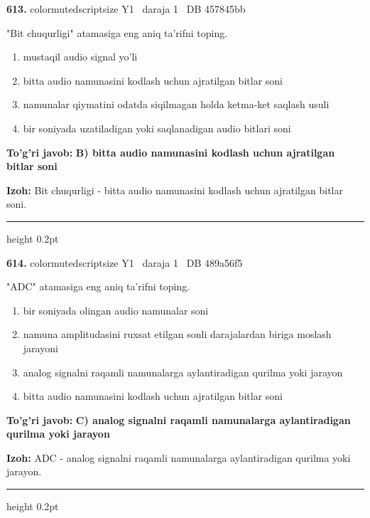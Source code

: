 \documentclass[10pt,a4paper,oneside]{article}
\begin{document}
\noindent\textbf{\color{ink}613.}  {color{muted}scriptsize Y1 \textbullet\ daraja 1 \textbullet\ DB 457845bb}
\par
"Bit chuqurligi" atamasiga eng aniq ta'rifni toping.
\begin{enumerate}[label=\Alph*),leftmargin=9mm]
\item mustaqil audio signal yo'li
\item bitta audio namunasini kodlash uchun ajratilgan bitlar soni
\item namunalar qiymatini odatda siqilmagan holda ketma-ket saqlash usuli
\item bir soniyada uzatiladigan yoki saqlanadigan audio bitlari soni
\end{enumerate}
\begin{tcolorbox}[enhanced,breakable,colback=teal!4,colframe=teal!50!black,boxrule=0.5pt,arc=1.1mm,left=3mm,right=3mm,top=1.7mm,bottom=1.7mm,before skip=2mm,after skip=2mm]
\textbf{\color{teal}To'g'ri javob:} \textbf{B) bitta audio namunasini kodlash uchun ajratilgan bitlar soni}
\par\smallskip
\textbf{Izoh:} Bit chuqurligi - bitta audio namunasini kodlash uchun ajratilgan bitlar soni.
\end{tcolorbox}
\vspace{2mm}\hrule height 0.2pt \vspace{3mm}

\noindent\textbf{\color{ink}614.}  {color{muted}scriptsize Y1 \textbullet\ daraja 1 \textbullet\ DB 489a56f5}
\par
"ADC" atamasiga eng aniq ta'rifni toping.
\begin{enumerate}[label=\Alph*),leftmargin=9mm]
\item bir soniyada olingan audio namunalar soni
\item namuna amplitudasini ruxsat etilgan sonli darajalardan biriga moslash jarayoni
\item analog signalni raqamli namunalarga aylantiradigan qurilma yoki jarayon
\item bitta audio namunasini kodlash uchun ajratilgan bitlar soni
\end{enumerate}
\begin{tcolorbox}[enhanced,breakable,colback=teal!4,colframe=teal!50!black,boxrule=0.5pt,arc=1.1mm,left=3mm,right=3mm,top=1.7mm,bottom=1.7mm,before skip=2mm,after skip=2mm]
\textbf{\color{teal}To'g'ri javob:} \textbf{C) analog signalni raqamli namunalarga aylantiradigan qurilma yoki jarayon}
\par\smallskip
\textbf{Izoh:} ADC - analog signalni raqamli namunalarga aylantiradigan qurilma yoki jarayon.
\end{tcolorbox}
\vspace{2mm}\hrule height 0.2pt \vspace{3mm}
\end{document}
